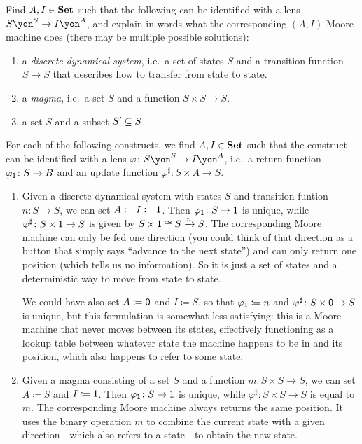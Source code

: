 \documentclass[Book-Poly]{subfiles}
\begin{document}
\begin{exercise}
Find $A,I\in\smset$ such that the following can be identified with a lens $S\yon^S\to I\yon^A$, and explain in words what the corresponding $(A,I)$-Moore machine does (there may be multiple possible solutions):
\begin{enumerate}
	\item a \emph{discrete dynamical system}, i.e.\ a set of states $S$ and a transition function $S\to S$ that describes how to transfer from state to state.
	\item a \emph{magma}, i.e.\ a set $S$ and a function $S\times S\to S$.
	\item a set $S$ and a subset $S'\ss S$.\qedhere
\end{enumerate}
\begin{solution}
For each of the following constructs, we find $A,I\in\smset$ such that the construct can be identified with a lens $\varphi\colon S\yon^S\to I\yon^A$, i.e.\ a return function $\varphi_\1\colon S\to B$ and an update function $\varphi^\sharp\colon S\times A\to S$.
\begin{enumerate}
  \item Given a discrete dynamical system with states $S$ and transition funtion $n\colon S\to S$, we can set $A\coloneqq I\coloneqq\1$.
  Then $\varphi_\1\colon S\to\1$ is unique, while $\varphi^\sharp\colon S\times\1\to S$ is given by $S\times\1\iso S\To{n}S$.
  The corresponding Moore machine can only be fed one direction (you could think of that direction as a button that simply says ``advance to the next state'') and can only return one position (which tells us no information).
  So it is just a set of states and a deterministic way to move from state to state.

  We could have also set $A\coloneqq\0$ and $I\coloneqq S$, so that $\varphi_\1\coloneqq n$ and $\varphi^\sharp\colon S\times\0\to S$ is unique, but this formulation is somewhat less satisfying: this is a Moore machine that never moves between its states, effectively functioning as a lookup table between whatever state the machine happens to be in and its position, which also happens to refer to some state.

  \item Given a magma consisting of a set $S$ and a function $m\colon S\times S\to S$, we can set $A \coloneqq S$ and $I\coloneqq\1$.
  Then $\varphi_\1\colon S\to\1$ is unique, while $\varphi^\sharp\colon S\times S\to S$ is equal to $m$.
  The corresponding Moore machine always returns the same position.
  It uses the binary operation $m$ to combine the current state with a given direction---which also refers to a state---to obtain the new state.


\end{enumerate}
\end{solution}
\end{exercise}
\end{document}
